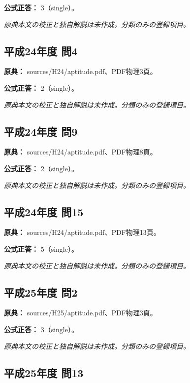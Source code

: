 \textbf{公式正答：} 3（single）。

\par\textit{原典本文の校正と独自解説は未作成。分類のみの登録項目。}

\subsection{平成24年度 問4}
\label{q:h24-reg-apt-04}

\noindent\textbf{原典：} sources/H24/aptitude.pdf、PDF物理3頁。

\textbf{公式正答：} 2（single）。

\par\textit{原典本文の校正と独自解説は未作成。分類のみの登録項目。}

\subsection{平成24年度 問9}
\label{q:h24-reg-apt-09}

\noindent\textbf{原典：} sources/H24/aptitude.pdf、PDF物理8頁。

\textbf{公式正答：} 2（single）。

\par\textit{原典本文の校正と独自解説は未作成。分類のみの登録項目。}

\subsection{平成24年度 問15}
\label{q:h24-reg-apt-15}

\noindent\textbf{原典：} sources/H24/aptitude.pdf、PDF物理13頁。

\textbf{公式正答：} 5（single）。

\par\textit{原典本文の校正と独自解説は未作成。分類のみの登録項目。}

\subsection{平成25年度 問2}
\label{q:h25-reg-apt-02}

\noindent\textbf{原典：} sources/H25/aptitude.pdf、PDF物理3頁。

\textbf{公式正答：} 3（single）。

\par\textit{原典本文の校正と独自解説は未作成。分類のみの登録項目。}

\subsection{平成25年度 問13}
\label{q:h25-reg-apt-13}

